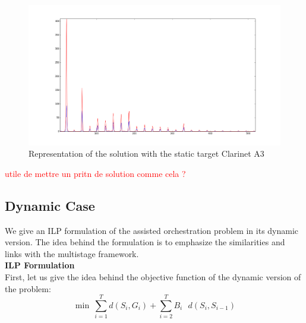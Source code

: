 \documentclass[a4paper]{book}
\newcommand{\alex}[2]{\textcolor{red}{#1}}
\begin{document}
\begin{figure}[ht!]
    \centering
    \includegraphics[scale=0.3]{clarinetA3.png}
    \caption{Representation of the solution with the static target Clarinet A3 }
    \label{fig:claA3}
\end{figure}

\alex{utile de mettre un pritn de solution comme cela ? }\\
\subsection{Dynamic Case}\label{sec:expdyn}

We give an ILP formulation of the assisted orchestration problem in its dynamic version. The idea behind the formulation is to emphasize the similarities and links with the multistage framework.\\

\textbf{ILP Formulation}\\
First, let us give the idea behind the objective function of the dynamic version of the problem:\\
$$\min \ \sum\limits_{i=1} ^ T d(S_i,G_i) +  \sum\limits_{i=2}^T B_i \text{ }d(S_i,S_{i-1}) $$

 
\end{document}
